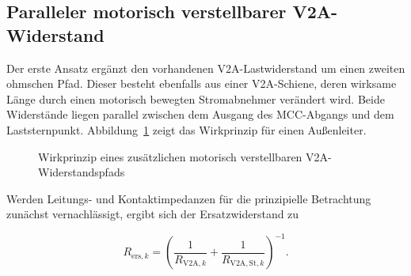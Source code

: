 \subsection{Paralleler motorisch verstellbarer V2A-Widerstand}
\label{sec:konzept_paralleler_v2a}

Der erste Ansatz ergänzt den vorhandenen V2A-Lastwiderstand um einen zweiten
ohmschen Pfad. Dieser besteht ebenfalls aus einer V2A-Schiene, deren wirksame
Länge durch einen motorisch bewegten Stromabnehmer verändert wird. Beide
Widerstände liegen parallel zwischen dem Ausgang des MCC-Abgangs und dem
Laststernpunkt. Abbildung~\ref{fig:konzept_paralleler_v2a} zeigt das
Wirkprinzip für einen Außenleiter.

\begin{figure}[H]
    \centering
    \caption{Wirkprinzip eines zusätzlichen motorisch verstellbaren
    V2A-Widerstandspfads}
    \label{fig:konzept_paralleler_v2a}
\end{figure}

Werden Leitungs- und Kontaktimpedanzen für die prinzipielle Betrachtung
zunächst vernachlässigt, ergibt sich der Ersatzwiderstand zu

\begin{equation}
    R_{\mathrm{ers},k}
    =
    \left(
        \frac{1}{R_{\mathrm{V2A},k}}
        +
        \frac{1}{R_{\mathrm{V2A,St},k}}
    \right)^{-1}.
    \label{eq:paralleler_v2a_ersatzwiderstand}
\end{equation}

